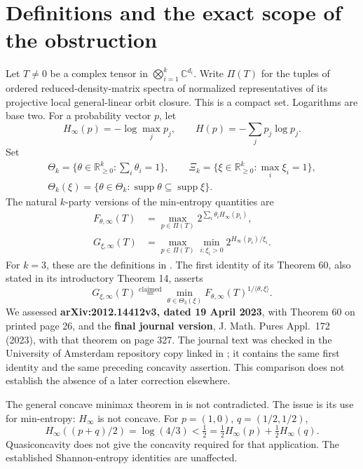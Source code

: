 \documentclass[11pt,a4paper]{article}
\newcommand{\R}{\mathbb R}
\newcommand{\C}{\mathbb C}
\newcommand{\supp}{\operatorname{supp}}
\newcommand{\Hinf}{H_{\infty}}
\begin{document}
\section{Definitions and the exact scope of the obstruction}
Let \(T\ne0\) be a complex tensor in \(\bigotimes_{i=1}^k\C^{d_i}\).
Write \(\Pi(T)\) for the tuples of ordered reduced-density-matrix
spectra of normalized representatives of its projective local
general-linear orbit closure. This is a compact set. Logarithms are
base two. For a probability vector \(p\), let
\[
 \Hinf(p)=-\log\max_jp_j,\qquad H(p)=-\sum_jp_j\log p_j .
\]
Set
\[
 \begin{gathered}
 \Theta_k=\{\theta\in\R_{\ge0}^k:\textstyle\sum_i\theta_i=1\},\qquad
 \Xi_k=\{\xi\in\R_{\ge0}^k:\max_i\xi_i=1\},\\
 \Theta_k(\xi)=\{\theta\in\Theta_k:\supp\theta\subseteq\supp\xi\}.
 \end{gathered}
\]
The natural \(k\)-party versions of the min-entropy quantities are
\begin{align}
 F_{\theta,\infty}(T)
 &=\max_{p\in\Pi(T)}2^{\sum_i\theta_i\Hinf(p_i)},\label{eq:F}\\
 G_{\xi,\infty}(T)
 &=\max_{p\in\Pi(T)}\min_{i:\xi_i>0}2^{\Hinf(p_i)/\xi_i}.
 \label{eq:G}
\end{align}
For \(k=3\), these are the definitions in \cite[Section 5.3]{CLZ}.
The first identity of its Theorem 60, also stated in its introductory
Theorem 14, asserts
\begin{equation}
 G_{\xi,\infty}(T)
 \stackrel{\text{claimed}}{=}
 \min_{\theta\in\Theta_3(\xi)}
 F_{\theta,\infty}(T)^{1/\langle\theta,\xi\rangle}.
 \label{eq:claimed}
\end{equation}
We assessed \textbf{arXiv:2012.14412v3, dated 19 April 2023}, with
Theorem 60 on printed page 26, and the \textbf{final journal version},
J. Math. Pures Appl.\ 172 (2023), with that theorem on page 327.
The journal text was checked in the University of Amsterdam repository
copy linked in \cite{CLZ}; it contains the same first identity and
the same preceding concavity assertion. This comparison does not
establish the absence of a later correction elsewhere.

The general concave minimax theorem in \cite[Theorem 50]{CLZ} is not
contradicted. The issue is its use for min-entropy: \(\Hinf\) is not
concave. For \(p=(1,0)\), \(q=(1/2,1/2)\),
\[
 \Hinf((p+q)/2)=\log(4/3)<\tfrac12
 =\tfrac12\Hinf(p)+\tfrac12\Hinf(q).
\]
Quasiconcavity does not give the concavity required for that application.
The established Shannon-entropy identities are unaffected.
\end{document}
